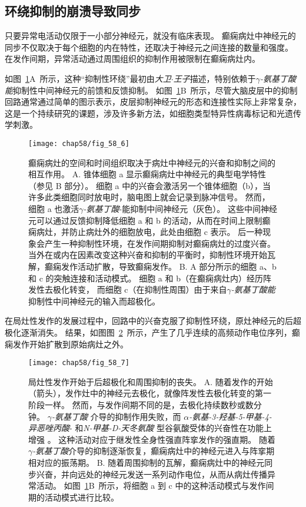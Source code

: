 \subsection{环绕抑制的崩溃导致同步}

只要异常电活动仅限于一小部分神经元，就没有临床表现。
癫痫病灶中神经元的同步不仅取决于每个细胞的内在特性，还取决于神经元之间连接的数量和强度。
在发作间期，异常活动通过周围组织的抑制作用被限制在癫痫病灶内。


如图~\ref{fig:58_6}A~所示，这种“抑制性环绕”最初由\textit{大卫$\cdot$王子}描述，特别依赖于\textit{$\gamma$-氨基丁酸能}抑制性中间神经元的前馈和反馈抑制。
如图~\ref{fig:58_6}B~所示，尽管大脑皮层中的抑制回路通常通过简单的图示表示，皮层抑制神经元的形态和连接性实际上非常复杂，这是一个持续研究的课题，涉及许多新方法，如细胞类型特异性病毒标记和光遗传学刺激。


\begin{figure}[htbp]
	\centering
	\texttt{[image: chap58/fig\_58\_6]}
	\caption{癫痫病灶的空间和时间组织取决于病灶中神经元的兴奋和抑制之间的相互作用。
		A. 锥体细胞 a 显示癫痫病灶中神经元的典型电学特性（参见 B 部分）。
		细胞 a 中的兴奋会激活另一个锥体细胞（b），当许多此类细胞同时放电时，脑电图上就会记录到脉冲信号。
		然而，细胞 a 也激活\textit{$\gamma$-氨基丁酸}-能抑制中间神经元（灰色）。
		这些中间神经元可以通过反馈抑制降低细胞 a 和 b 的活动，从而在时间上限制癫痫病灶，并防止病灶外的细胞放电，此处由细胞 c 表示。
		后一种现象会产生一种抑制性环境，在发作间期抑制对癫痫病灶的过度兴奋。
		当外在或内在因素改变这种兴奋和抑制的平衡时，抑制性环境开始瓦解，癫痫发作活动扩散，导致癫痫发作\cite{lothman1990seizures}。
		B. A 部分所示的细胞 a、b 和 c 的突触连接和活动模式。
		细胞 a 和 b（在癫痫病灶内）经历阵发性去极化转变， 而细胞 c（在抑制性周围）由于来自\textit{$\gamma$-氨基丁酸能}抑制性中间神经元的输入而超极化。}
	\label{fig:58_6}
\end{figure}


在局灶性发作的发展过程中，回路中的兴奋克服了抑制性环绕，原灶神经元的后超极化逐渐消失。
结果，如图图~\ref{fig:58_7}~所示，产生了几乎连续的高频动作电位序列，癫痫发作开始扩散到原始病灶之外。


\begin{figure}[htbp]
	\centering
	\texttt{[image: chap58/fig\_58\_7]}
	\caption{局灶性发作开始于后超极化和周围抑制的丧失\cite{lothman1993neurobiology}。
		A. 随着发作的开始（箭头），发作灶中的神经元去极化，就像阵发性去极化转变的第一阶段一样。
		然而，与发作间期不同的是，去极化持续数秒或数分钟。
		\textit{$\gamma$-氨基丁酸} 介导的抑制作用失败，而 \textit{$\alpha$-氨基-3-羟基-5-甲基-4-异恶唑丙酸}- 和\textit{N-甲基-D-天冬氨酸} 型谷氨酸受体的兴奋性在功能上增强 。
		这种活动对应于继发性全身性强直阵挛发作的强直期。
		随着\textit{$\gamma$-氨基丁酸}介导的抑制逐渐恢复，癫痫病灶中的神经元进入与阵挛期相对应的振荡期。
		B. 随着周围抑制的瓦解，癫痫病灶中的神经元同步兴奋，并向远处的神经元发送一系列动作电位，从而从病灶传播异常活动。
		如图~\ref{fig:58_6}B~所示，将细胞 a 到 c 中的这种活动模式与发作间期的活动模式进行比较。}
	\label{fig:58_7}
\end{figure}


